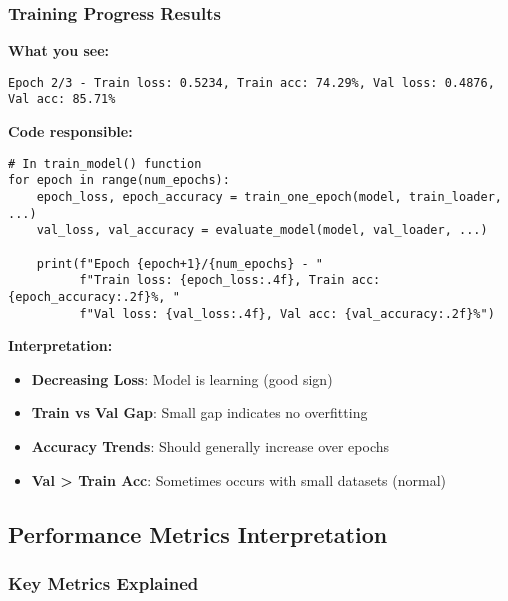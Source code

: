 \documentclass[12pt,a4paper]{article}
\begin{document}
\subsubsection{Training Progress Results}

\textbf{What you see:}
\begin{lstlisting}
Epoch 2/3 - Train loss: 0.5234, Train acc: 74.29%, Val loss: 0.4876, Val acc: 85.71%
\end{lstlisting}

\textbf{Code responsible:}
\begin{lstlisting}
# In train_model() function
for epoch in range(num_epochs):
    epoch_loss, epoch_accuracy = train_one_epoch(model, train_loader, ...)
    val_loss, val_accuracy = evaluate_model(model, val_loader, ...)
    
    print(f"Epoch {epoch+1}/{num_epochs} - "
          f"Train loss: {epoch_loss:.4f}, Train acc: {epoch_accuracy:.2f}%, "
          f"Val loss: {val_loss:.4f}, Val acc: {val_accuracy:.2f}%")
\end{lstlisting}

\textbf{Interpretation:}
\begin{itemize}
    \item \textbf{Decreasing Loss}: Model is learning (good sign)
    \item \textbf{Train vs Val Gap}: Small gap indicates no overfitting
    \item \textbf{Accuracy Trends}: Should generally increase over epochs
    \item \textbf{Val > Train Acc}: Sometimes occurs with small datasets (normal)
\end{itemize}

\subsection{Performance Metrics Interpretation}

\subsubsection{Key Metrics Explained}
\end{document}

